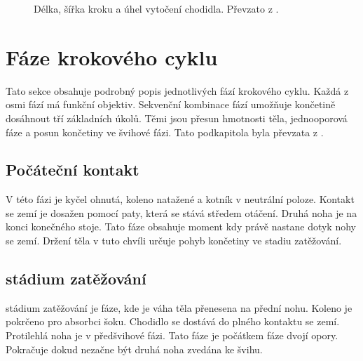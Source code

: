 \begin{figure}[h]
\begin{center}
\caption{Délka, šířka kroku a úhel vytočení chodidla. Převzato z \cite{gait_review}.} \label{step_length}
\end{center}
\end{figure}

\section{Fáze krokového cyklu}
Tato sekce obsahuje podrobný popis jednotlivých fází krokového cyklu. Každá z osmi fází má funkční objektiv. Sekvenční kombinace fází umožňuje končetině dosáhnout tří základních úkolů. Těmi jsou přesun hmotnosti těla, jednooporová fáze a posun končetiny ve švihové fázi. Tato podkapitola byla převzata z \cite{gait_review}. 
\subsection{Počáteční kontakt}
V této fázi je kyčel ohnutá, koleno natažené a kotník v neutrální poloze. Kontakt se zemí je dosažen pomocí paty, která se stává středem otáčení. Druhá noha je na konci konečného stoje. Tato fáze obsahuje moment kdy právě nastane dotyk nohy se zemí. Držení těla v tuto chvíli určuje pohyb končetiny ve stadiu zatěžování. 
\subsection{stádium zatěžování}
stádium zatěžování je fáze, kde je váha těla přenesena na přední nohu. Koleno je pokrčeno pro absorbci šoku. Chodidlo se dostává do plného kontaktu se zemí. Protilehlá noha je v předšvihové fázi. Tato fáze je počátkem fáze dvojí opory. Pokračuje dokud nezačne být druhá noha zvedána ke švihu. 
